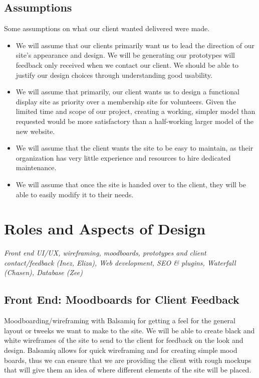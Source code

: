 \documentclass[10pt, a4paper, technote, draftclsnofoot,onecolumn ]{IEEEtran}
\begin{document}
\subsection{Assumptions}
Some assumptions on what our client wanted delivered were made. 
\begin{itemize}

\item We will assume that our clients primarily want us to lead the direction of our site’s appearance and design. We will be generating our prototypes will feedback only received when we contact our client. We should be able to justify our design choices through understanding good usability.
\item We will assume that primarily, our client wants us to design a functional display site as priority over a membership site for volunteers. Given the limited time and scope of our project, creating a working, simpler model than requested would be more satisfactory than a half-working larger model of the new website.
\item We will assume that the client wants the site to be easy to maintain, as their organization has very little experience and resources to hire dedicated maintenance. 
\item We will assume that once the site is handed over to the client, they will be able to easily modify it to their needs. 
\end{itemize}




\section{Roles and Aspects of Design}
\textit {Front end UI/UX, wireframing, moodboards, prototypes and client contact/feedback (Inez, Eliza), Web development, SEO & plugins, Waterfall (Chasen), Database (Zee)}

\subsection{Front End: Moodboards for Client Feedback}

Moodboarding/wireframing with Balsamiq for getting a feel for the general layout or tweeks we want to make to the site. We will be able to create black and white wireframes of the site to send to the client for feedback on the look and design. Balsamiq allows for quick wireframing and for creating simple mood boards, thus we can ensure that we are providing the client with rough mockups that will give them an idea of where different elements of the site will be placed. 
\end{document}
